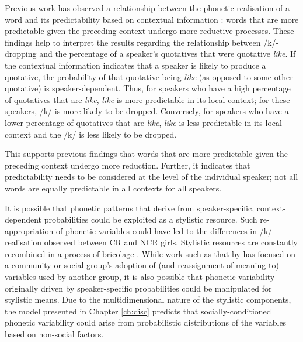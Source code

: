 Previous work has observed a relationship between the phonetic realisation of a word and its predictability based on contextual information \cite{jurafskyetal2002}: words that are more predictable given the preceding context undergo more reductive processes.  These findings help to interpret the results regarding the relationship between /k/-dropping and the percentage of a speaker's quotatives that were quotative \textit{like}.  If the contextual information indicates that a speaker is likely to produce a quotative, the probability of that quotative being \textit{like} (as opposed to some other quotative) is speaker-dependent.  Thus, for speakers who have a high percentage of quotatives that are \textit{like}, \textit{like} is more predictable in its local context; for these speakers, /k/ is more likely to be dropped.  Conversely, for speakers who have a lower percentage of quotatives that are \textit{like}, \textit{like} is less predictable in its local context and the /k/ is less likely to be dropped.

This supports previous findings that words that are more predictable given the preceding context undergo more reduction.  Further, it indicates that predictability needs to be considered at the level of the individual speaker; not all words are equally predictable in all contexts for all speakers.


It is possible that phonetic patterns that derive from speaker-specific, context-dependent probabilities could be exploited as a stylistic resource.  Such re-appropriation of phonetic variables could have led to the differences in /k/ realisation observed between CR and NCR girls.  Stylistic resources are constantly recombined in a process of bricolage \cite{hebdige1984,eckert2008}.  While work such as that by  has focused on a community or social group's adoption of (and reassignment of meaning to) variables used by another group, it is also possible that phonetic variability originally driven by speaker-specific probabilities could be manipulated for stylistic means.  Due to the multidimensional nature of the stylistic components, the model presented in Chapter \ref{ch:disc} predicts that socially-conditioned phonetic variability could arise from probabilistic distributions of the variables based on non-social factors.




